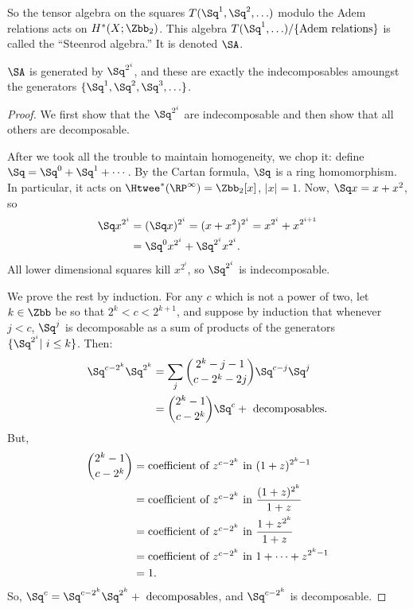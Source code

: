 So the tensor algebra on the squares $T(\Sq^1, \Sq^2, \ldots)$ modulo the Adem relations acts on $H^*(X; \Zbb_2)$.  This algebra $T(\Sq^1, \ldots) / \{\hbox{Adem relations}\}$ is called the ``Steenrod algebra.''  It is denoted $\SA$.
\begin{lem}
$\SA$ is generated by $\Sq^{2^i}$, and these are exactly the indecomposables amoungst the generators $\{\Sq^1,\Sq^2,\Sq^3,\ldots\}$.
\end{lem}
\begin{proof}
We first show that the $\Sq^{2^i}$ are indecomposable and then show that all others are decomposable.

After we took all the trouble to maintain homogeneity, we chop it: define $\Sq = \Sq^0 + \Sq^1 + \cdots$.  By the Cartan formula, $\Sq$ is a ring homomorphism.  In particular, it acts on $\Htwee^* (\RP^\infty) = \Zbb_2[x]$, $|x| = 1$.  Now, $\Sq x = x + x^2$, so
\begin{align*}
\Sq x^{2^i} & = (\Sq x)^{2^i} = (x + x^2)^{2^i} = x^{2^i} + x^{2^{i+1}} \\
& = \Sq^0 x^{2^i} + \Sq^{2^i} x^{2^i}.
\end{align*}
All lower dimensional squares kill $x^{2^i}$, so $\Sq^{2^i}$ is indecomposable.

We prove the rest by induction. For any $c$ which is not a power of two, let $k \in \Zbb$ be so that $2^k < c < 2^{k+1}$, and suppose by induction that whenever $j<c$, $\Sq^j$ is decomposable as a sum of products of the generators $\{\Sq^{2^i}|\ i\leq k\}$.  Then:
\begin{align*}
\Sq^{c-2^k} \Sq^{2^k} & = \sum_j \binom{2^k - j - 1}{c-2^k-2j} \Sq^{c-j}\Sq^j \\
& = \binom{2^k - 1}{c-2^k} \Sq^c + \mathrm{\ decomposables}.
\end{align*}
But,
\begin{align*}
\binom{2^k-1}{c-2^k} & = \hbox{coefficient of $z^{c-2^k}$ in}\ (1 + z)^{2^k-1} \\
& = \hbox{coefficient of $z^{c-2^k}$ in}\ \frac{(1+z)^{2^k}}{1+z} \\
& = \hbox{coefficient of $z^{c-2^k}$ in}\ \frac{1 + z^{2^k}}{1+z} \\
& = \hbox{coefficient of $z^{c-2^k}$ in}\ 1 + \cdots + z^{2^k - 1} \\
& = 1.
\end{align*}
So, $\Sq^c = \Sq^{c-2^k} \Sq^{2^k} + \mathrm{\ decomposables}$, and $\Sq^{c - 2^k}$ is decomposable.
\end{proof}

